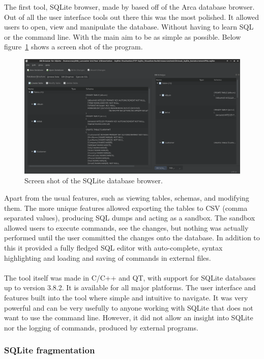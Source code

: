 The first tool, SQLite browser, made by \cite{sqlitebrowser} based off of the Arca database browser. Out of all the user interface tools out there this was the most polished. It allowed users to open, view and manipulate the database. Without having to learn SQL or the command line. With the main aim to be as simple as possible. Below figure~\ref{fig:db_browser_screen} shows a screen shot of the program.

\begin{figure}[H]
	\centering
	\includegraphics[scale=0.25]{images/db_browser.png}
	\caption{Screen shot of the SQLite database browser.}
	\label{fig:db_browser_screen}
\end{figure}

Apart from the usual features, such as viewing tables, schemas, and modifying them. The more unique features allowed exporting the tables to CSV (comma separated values), producing SQL dumps and acting as a sandbox. The sandbox allowed users to execute commands, see the changes, but nothing was actually performed until the user committed the changes onto the database. In addition  to this it provided a fully fledged SQL editor with auto-complete, syntax highlighting and loading and saving of commands in external files.
\\\\
The tool itself was made in C/C++ and QT, with support for SQLite databases up to version 3.8.2. It is available for all major platforms. The user interface and features built into the tool where simple and intuitive to navigate. It was very powerful and can be very usefully to anyone working with SQLite that does not want to use the command line. However, it did not allow an insight into SQLite nor the logging of commands, produced by external programs.

\subsubsection{SQLite fragmentation}
\label{subsubsec:sqlite_fragmentation}

